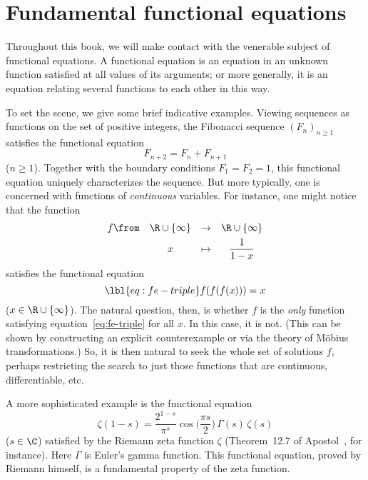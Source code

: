 \chapter{Fundamental functional equations}


Throughout this book, we will make contact with the venerable
subject of functional equations.  A functional%
%
%
equation is an equation in an unknown function satisfied at all values of
its arguments; or more generally, it is an equation relating several
functions to each other in this way.

To set the scene, we give some brief indicative examples.  Viewing
sequences as functions on the set of positive integers, the
Fibonacci%
%
% 
sequence $(F_n)_{n \geq 1}$ satisfies the functional equation
\[
F_{n + 2} = F_n + F_{n + 1} 
\]
($n \geq 1$).  Together with the boundary conditions $F_1 = F_2 = 1$, this
functional equation uniquely characterizes the sequence.  But more
typically, one is concerned with functions of \emph{continuous} variables.
For instance, one might notice that the function
\[
\begin{array}{cccc}
f\from  &\R \cup \{\infty\}     &\to            &\R\cup\{\infty\}\\[1ex]
        &x                      &\mapsto        &
\displaystyle\frac{1}{1 - x}
\end{array}
\]
satisfies the functional equation
% 
\begin{equation}
\lbl{eq:fe-triple}
f(f(f(x))) = x
\end{equation}
% 
($x \in \R \cup \{\infty\}$).  The natural question, then, is whether $f$
is the \emph{only} function satisfying equation~\eqref{eq:fe-triple} for
all $x$.  In this case, it is not.  (This can be shown by constructing an
explicit counterexample or via the theory of M\"obius
transformations.)  So, it is then natural to seek the whole set of
solutions $f$, perhaps restricting the search to just those functions that
are continuous, differentiable, etc.

A more sophisticated example is the functional equation
% 
\[
\zeta(1 - s) 
=
\frac{2^{1 - s}}{\pi^s} 
\cos\biggl(\frac{\pi s}{2}\biggr)\,\Gamma(s)\,\zeta(s)
\]
% 
($s \in \C$) satisfied by the Riemann%
%
% 
zeta function $\zeta$ (Theorem~12.7 of Apostol~\cite{AposIAN}, for
instance).  Here $\Gamma$ is Euler's gamma function.  This functional
equation, proved by Riemann himself, is a fundamental property of the zeta
function.

